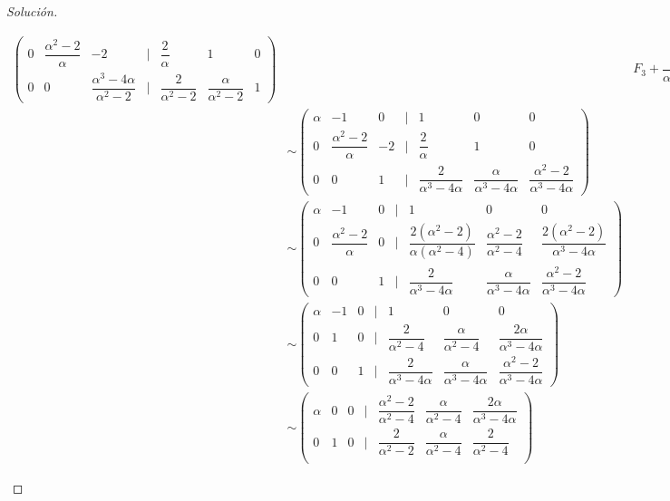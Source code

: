 \documentclass[a4,11pt]{aleph-notas}
\begin{document}
\begin{proof}[Solución]
\begin{enumerate}
\begin{align*}
\begin{pmatrix}
                0 & \dfrac{\alpha^2-2}{\alpha} & -2 & | & \dfrac{2}{\alpha} & 1 & 0\\
                0 & 0 & \dfrac{\alpha^3-4\alpha}{\alpha^2-2} & | & \dfrac{2}{\alpha^2-2} & \dfrac{\alpha}{\alpha^2-2} & 1
            \end{pmatrix} && F_3 + \dfrac{\alpha}{\alpha^2-2} F_2 \rightarrow F_3, \\
            & \sim \begin{pmatrix}
                \alpha & -1 & 0 & | & 1 & 0 & 0 \\
                0 & \dfrac{\alpha^2-2}{\alpha} & -2 & | & \dfrac{2}{\alpha} & 1 & 0\\
                0 & 0 & 1 & | & \dfrac{2}{\alpha^3-4\alpha} & \dfrac{\alpha}{\alpha^3-4\alpha} & \dfrac{\alpha^2-2}{\alpha^3-4\alpha}
            \end{pmatrix} && \dfrac{\alpha^2-2}{\alpha^3-4\alpha} F_3 \rightarrow F_3, \\
            & \sim \begin{pmatrix}
                \alpha & -1 & 0 & | & 1 & 0 & 0 \\
                0 & \dfrac{\alpha^2-2}{\alpha} & 0 & | & \dfrac{2(\alpha^2-2)}{\alpha(\alpha^2-4)} & \dfrac{\alpha^2-2}{\alpha^2-4} & \dfrac{2(\alpha^2-2)}{\alpha^3-4\alpha}\\
                0 & 0 & 1 & | & \dfrac{2}{\alpha^3-4\alpha} & \dfrac{\alpha}{\alpha^3-4\alpha} & \dfrac{\alpha^2-2}{\alpha^3-4\alpha}
            \end{pmatrix} &&  F_2 + 2 F_3 \rightarrow F_2, \\
            & \sim \begin{pmatrix}
                \alpha & -1 & 0 & | & 1 & 0 & 0 \\
                0 & 1 & 0 & | & \dfrac{2}{\alpha^2-4} & \dfrac{\alpha}{\alpha^2-4} & \dfrac{2\alpha}{\alpha^3-4\alpha}\\
                0 & 0 & 1 & | & \dfrac{2}{\alpha^3-4\alpha} & \dfrac{\alpha}{\alpha^3-4\alpha} & \dfrac{\alpha^2-2}{\alpha^3-4\alpha}
            \end{pmatrix} && \dfrac{\alpha}{\alpha^2-2}F_2 \rightarrow F_2, \\
            & \sim \begin{pmatrix}
                \alpha & 0 & 0 & | & \dfrac{\alpha^2-2}{\alpha^2-4} & \dfrac{\alpha}{\alpha^2-4} & \dfrac{2\alpha}{\alpha^3-4\alpha}\\
                0 & 1 & 0 & | & \dfrac{2}{\alpha^2-2} & \dfrac{\alpha}{\alpha^2-4} & \dfrac{2}{\alpha^2-4}\\

\end{pmatrix}
\end{align*}
\end{enumerate}
\end{proof}
\end{document}
